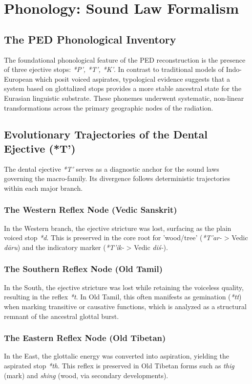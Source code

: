 \chapter{Phonology: Sound Law Formalism}

\section{The PED Phonological Inventory}
The foundational phonological feature of the PED reconstruction is the presence of three ejective stops: \textit{*P', *T', *K'}. In contrast to traditional models of Indo-European which posit voiced aspirates, typological evidence suggests that a system based on glottalized stops provides a more stable ancestral state for the Eurasian linguistic substrate. These phonemes underwent systematic, non-linear transformations across the primary geographic nodes of the radiation.

\section{Evolutionary Trajectories of the Dental Ejective (*T')}
The dental ejective \textit{*T'} serves as a diagnostic anchor for the sound laws governing the macro-family. Its divergence follows deterministic trajectories within each major branch.

\subsection{The Western Reflex Node (Vedic Sanskrit)}
In the Western branch, the ejective stricture was lost, surfacing as the plain voiced stop \textit{*d}. This is preserved in the core root for 'wood/tree' (\textit{*T'ar-} > Vedic \textit{dāru}) and the indicatory marker (\textit{*T'ik-} > Vedic \textit{diś-}).

\subsection{The Southern Reflex Node (Old Tamil)}
In the South, the ejective stricture was lost while retaining the voiceless quality, resulting in the reflex \textit{*t}. In Old Tamil, this often manifests as gemination (\textit{*tt}) when marking transitive or causative functions, which is analyzed as a structural remnant of the ancestral glottal burst.

\subsection{The Eastern Reflex Node (Old Tibetan)}
In the East, the glottalic energy was converted into aspiration, yielding the aspirated stop \textit{*th}. This reflex is preserved in Old Tibetan forms such as \textit{thig} (mark) and \textit{shing} (wood, via secondary developments).

